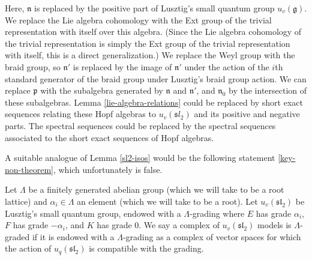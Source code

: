 \documentclass[11pt,letterpaper]{article}
\theoremstyle{definition}
\theoremstyle{remark}
\numberwithin{equation}{section}
\theoremstyle{dotless}
\newcommand{\qv}{v}
\begin{document}
Here, $\mathfrak n$ is replaced by the positive part of Lusztig's small quantum group $u_{\qv}(\mathfrak g)$. We replace the Lie algebra cohomology with the Ext group of the trivial representation with itself over this algebra. (Since the Lie algebra cohomology of the trivial representation is simply the Ext group of the trivial representation with itself, this is a direct generalization.)
 We replace the Weyl group with the braid group, so $\mathfrak n'$ is replaced by the image of $\mathfrak n'$ under the action of the $i$th standard generator of the braid group under Lusztig's braid group action.  We can replace $\mathfrak p$ with the subalgebra generated by $\mathfrak n$ and $\mathfrak n'$, and $\mathfrak n_0$ by the intersection of these subalgebras.  Lemma \ref{lie-algebra-relations} could be replaced by short exact sequences relating these Hopf algebras to $u_{\qv}(\mathfrak sl_2)$ and its positive and negative parts. The spectral sequences could be replaced by the spectral sequences associated to the short exact sequences of Hopf algebras. 

 A suitable analogue of Lemma \ref{sl2-isos} would be the following statement \ref{key-non-theorem}, which unfortunately is false.

 Let $\Lambda$ be a finitely generated abelian group (which we will take to be a root lattice) and $\alpha_i \in \Lambda$ an element (which we will take to be a root). Let $u_{\qv}(\mathfrak{sl}_2)$ be Lusztig's small quantum group, endowed with a $\Lambda$-grading where $E$ has grade $\alpha_i$, $F$ has grade $-\alpha_i$, and $K$ has grade $0$. We say a complex of $u_{\qv}(\mathfrak{sl}_2)$ models is $\Lambda$-graded if it is endowed with a $\Lambda$-grading as a complex of vector spaces for which the action of $u_q(\mathfrak{sl}_2)$ is compatible with the grading.
\end{document}
